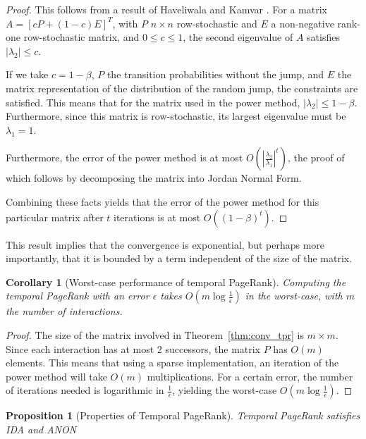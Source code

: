 \documentclass[a4paper,11pt]{book}
\newcommand{\eps}{\epsilon}
\newtheorem{proposition}{Proposition}
\newtheorem*{corollary}{Corollary}
\theoremstyle{definition}
\begin{document}
\begin{proof}
    This follows from a result of Haveliwala and Kamvar \cite{haveliwala2003second}.
    For a matrix $A = [cP + (1-c)E]^T$, with $P$ $n \times n$ row-stochastic
    and $E$ a non-negative rank-one row-stochastic matrix, and $0 \leq c \leq 1$, the
    second eigenvalue of $A$ satisfies $|\lambda_2| \leq c$. 

    If we take $c=1-\beta$, $P$ the transition probabilities without the jump, and $E$ the
    matrix representation of the distribution of the random jump, the constraints are satisfied.
    This means that for the matrix used in the power method, $|\lambda_2| \leq 1-\beta$.
    Furthermore, since this matrix is row-stochastic, its largest eigenvalue must be $\lambda_1=1$.

    Furthermore, the error of the power method is at most $O\left(\left|\frac{\lambda_2}{\lambda_1}\right|^t\right)$,
    the proof of which follows by decomposing the matrix into Jordan Normal Form.

    Combining these facts yields that the error of the power method for this particular matrix
    after $t$ iterations is at most $O( (1-\beta)^t)$.
\end{proof}

This result implies that the convergence is exponential, but perhaps more importantly, that it is bounded
by a term independent of the size of the matrix. 

\begin{corollary}[Worst-case performance of temporal PageRank]
    Computing the temporal PageRank with an error $\eps$ takes $O(m\log\frac1\eps)$ in the worst-case,
    with $m$ the number of interactions.
\end{corollary}
\begin{proof}
    The size of the matrix involved in Theorem~\ref{thm:conv_tpr} is $m \times m$. Since each interaction
    has at most 2 successors, the matrix $P$ has $O(m)$ elements. This means that using a sparse implementation,
    an iteration of the power method will take $O(m)$ multiplications. For a certain error, the number of
    iterations needed is logarithmic in $\frac1\eps$, yielding the worst-case $O(m\log\frac1\eps)$.
\end{proof}

\begin{proposition}[Properties of Temporal PageRank]
    Temporal PageRank satisfies IDA and ANON  
    \label{prop:prop_temp_pr}
\end{proposition}
\end{document}
